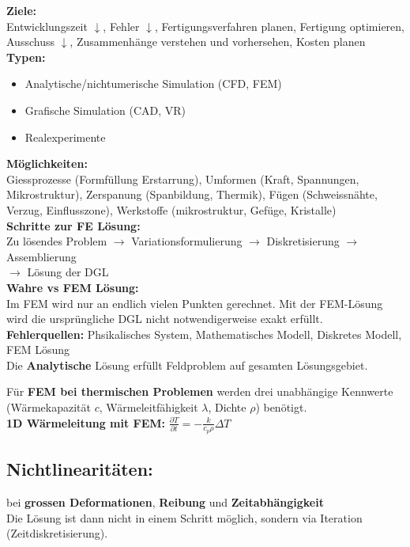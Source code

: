\textbf{Ziele:}\\
Entwicklungszeit $\downarrow$, Fehler $\downarrow$, Fertigungsverfahren planen, 
Fertigung optimieren, Ausschuss $\downarrow $, Zusammenhänge 
verstehen und vorhersehen, Kosten planen\\

\textbf{Typen:}
\begin{itemize}
    \item Analytische/nichtumerische Simulation (CFD, FEM)
    \item Grafische Simulation (CAD, VR)
    \item Realexperimente
\end{itemize}
\hspace{0.05\linewidth}

\textbf{Möglichkeiten:}\\
Giessprozesse (Formfüllung Erstarrung), Umformen (Kraft, Spannungen, Mikrostruktur), Zerspanung (Spanbildung, Thermik), Fügen (Schweissnähte, Verzug, Einflusszone), Werkstoffe (mikrostruktur, Gefüge, Kristalle) \\

\textbf{Schritte zur FE Lösung:}\\
Zu lösendes Problem $\rightarrow$ Variationsformulierung $\rightarrow$ Diskretisierung $\rightarrow$ Assemblierung\\ $\rightarrow$ Lösung der DGL\\

\textbf{Wahre vs FEM Lösung:}\\
Im FEM wird nur an endlich vielen Punkten gerechnet. Mit der FEM-Lösung wird die ursprüngliche DGL nicht notwendigerweise exakt erfüllt. \\

\textbf{Fehlerquellen:} 
Phsikalisches System, Mathematisches Modell, Diskretes Modell, FEM Lösung \\

Die \textbf{Analytische} Lösung erfüllt Feldproblem auf gesamten Lösungsgebiet.

Für \textbf{FEM bei thermischen Problemen} werden drei unabhängige Kennwerte (Wärmekapazität $c$, Wärmeleitfähigkeit $\lambda$, Dichte $\rho$) benötigt.\\

\textbf{1D Wärmeleitung mit FEM:} $\frac{\partial T}{\partial t} = - \frac{k}{c_p \rho }\Delta T$

\subsection*{Nichtlinearitäten:}
bei \textbf{grossen Deformationen}, \textbf{Reibung} und \textbf{Zeitabhängigkeit}\\
Die Lösung ist dann nicht in einem Schritt möglich, sondern via Iteration (Zeitdiskretisierung).\\ 


